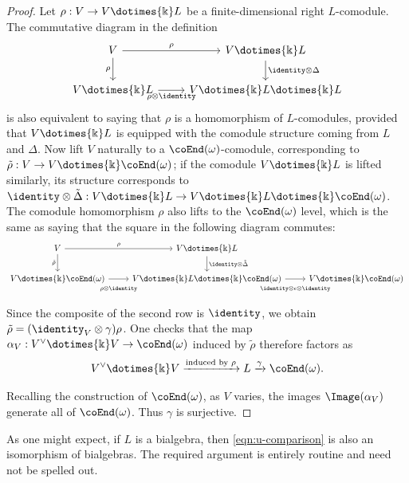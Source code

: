 \begin{proof}
	Let $\rho: V \to V \dotimes{\Bbbk} L$ be a finite-dimensional right
	$L$-comodule. The commutative diagram in the definition
	\[\begin{tikzcd}
		V \arrow[r, "\rho"] \arrow[d, "\rho"'] & V \dotimes{\Bbbk} L \arrow[d, "{\identity \otimes \Delta}"] \\
		V \dotimes{\Bbbk} L \arrow[r, "{\rho \otimes \identity}"'] & V \dotimes{\Bbbk} L \dotimes{\Bbbk} L
	\end{tikzcd}\]
	is also equivalent to saying that $\rho$ is a homomorphism of
	$L$-comodules, provided that $V \dotimes{\Bbbk} L$ is equipped with the
	comodule structure coming from $L$ and $\Delta$. Now lift $V$ naturally
	to a $\coEnd(\omega)$-comodule, corresponding to
	$\tilde{\rho}: V \to V \dotimes{\Bbbk} \coEnd(\omega)$; if the comodule
	$V \dotimes{\Bbbk} L$ is lifted similarly, its structure corresponds to
	$\identity \otimes \tilde{\Delta}: V \dotimes{\Bbbk} L \to V \dotimes{\Bbbk} L \dotimes{\Bbbk} \coEnd(\omega)$. The comodule homomorphism
	$\rho$ also lifts to the $\coEnd(\omega)$ level, which is the same as
	saying that the square in the following diagram commutes:
	\[\begin{tikzcd}
		V \arrow[r, "\rho"] \arrow[d, "{\tilde{\rho}}"'] & V \dotimes{\Bbbk} L \arrow[d, "{\identity \otimes \tilde{\Delta}}"] & \\
		V \dotimes{\Bbbk} \coEnd(\omega) \arrow[r, "{\rho \otimes \identity}"' inner sep=0.8em] & V \dotimes{\Bbbk} L \dotimes{\Bbbk} \coEnd(\omega) \arrow[r, "{\identity \otimes \epsilon \otimes \identity}"' inner sep=0.8em] & V \dotimes{\Bbbk} \coEnd(\omega)
	\end{tikzcd}\]
	Since the composite of the second row is $\identity$, we obtain
	$\tilde{\rho} = (\identity_V \otimes \gamma)\rho$. One checks that the
	map $\alpha_V: V^\vee \dotimes{\Bbbk} V \to \coEnd(\omega)$ induced by
	$\tilde{\rho}$ therefore factors as
	\[ V^\vee \dotimes{\Bbbk} V \xrightarrow{\text{induced by $\rho$}} L \xrightarrow{\gamma} \coEnd(\omega). \]
	
	Recalling the construction of $\coEnd(\omega)$, as $V$ varies, the
	images $\Image(\alpha_V)$ generate all of $\coEnd(\omega)$. Thus
	$\gamma$ is surjective.
\end{proof}

As one might expect, if $L$ is a bialgebra, then \eqref{eqn:u-comparison} is
also an isomorphism of bialgebras. The required argument is entirely routine
and need not be spelled out.

